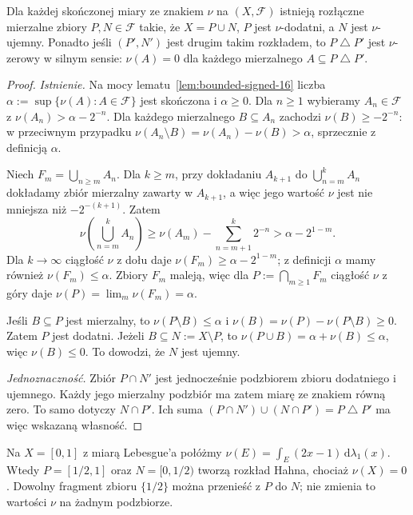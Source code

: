 \begin{twierdzenie}
\label{thm:hahn-16}
Dla każdej skończonej miary ze znakiem $\nu$ na
$(X,\mathcal F)$ istnieją rozłączne mierzalne zbiory
$P,N\in\mathcal F$ takie, że $X=P\cup N$,
$P$ jest $\nu$-dodatni, a $N$ jest $\nu$-ujemny.
Ponadto jeśli $(P',N')$ jest drugim takim rozkładem,
to $P\mathbin\triangle P'$ jest $\nu$-zerowy
w silnym sensie: $\nu(A)=0$ dla każdego mierzalnego
$A\subseteq P\mathbin\triangle P'$.
\end{twierdzenie}
\begin{proof}
\emph{Istnienie.} Na mocy lematu~\ref{lem:bounded-signed-16}
liczba $\alpha:=\sup\{\nu(A):A\in\mathcal F\}$ jest
skończona i $\alpha\ge0$. Dla $n\ge1$ wybieramy
$A_n\in\mathcal F$ z $\nu(A_n)>\alpha-2^{-n}$.
Dla każdego mierzalnego $B\subseteq A_n$ zachodzi
$\nu(B)\ge-2^{-n}$: w przeciwnym przypadku
$\nu(A_n\setminus B)=\nu(A_n)-\nu(B)>\alpha$,
sprzecznie z definicją $\alpha$.

Niech $F_m=\bigcup_{n\ge m}A_n$. Dla $k\ge m$,
przy dokładaniu $A_{k+1}$ do $\bigcup_{n=m}^kA_n$
dokładamy zbiór mierzalny zawarty w $A_{k+1}$,
a więc jego wartość $\nu$ jest nie mniejsza
niż $-2^{-(k+1)}$. Zatem
\[
\nu\left(\bigcup_{n=m}^kA_n\right)
\ge\nu(A_m)-\sum_{n=m+1}^k2^{-n}
>\alpha-2^{1-m}.
\]
Dla $k\to\infty$ ciągłość $\nu$ z dołu daje
$\nu(F_m)\ge\alpha-2^{1-m}$; z definicji
$\alpha$ mamy również $\nu(F_m)\le\alpha$.
Zbiory $F_m$ maleją, więc dla
$P:=\bigcap_{m\ge1}F_m$ ciągłość $\nu$ z góry daje
$\nu(P)=\lim_m\nu(F_m)=\alpha$.

Jeśli $B\subseteq P$ jest mierzalny, to
$\nu(P\setminus B)\le\alpha$ i
$\nu(B)=\nu(P)-\nu(P\setminus B)\ge0$.
Zatem $P$ jest dodatni. Jeżeli $B\subseteq N:=X\setminus P$,
to $\nu(P\cup B)=\alpha+\nu(B)\le\alpha$,
więc $\nu(B)\le0$. To dowodzi, że $N$ jest ujemny.

\emph{Jednoznaczność.} Zbiór $P\cap N'$ jest jednocześnie
podzbiorem zbioru dodatniego i ujemnego. Każdy jego
mierzalny podzbiór ma zatem miarę ze znakiem równą zero.
To samo dotyczy $N\cap P'$. Ich suma
$(P\cap N')\cup(N\cap P')=P\mathbin\triangle P'$ ma
więc wskazaną własność.
\end{proof}

\begin{przyklad}
Na $X=[0,1]$ z miarą Lebesgue'a połóżmy
$\nu(E)=\int_E(2x-1)\,\mathrm d\lambda_1(x)$.
Wtedy $P=[1/2,1]$ oraz $N=[0,1/2)$ tworzą rozkład
Hahna, chociaż $\nu(X)=0$. Dowolny fragment
zbioru $\{1/2\}$ można przenieść z $P$ do $N$;
nie zmienia to wartości $\nu$ na żadnym podzbiorze.
\end{przyklad}

